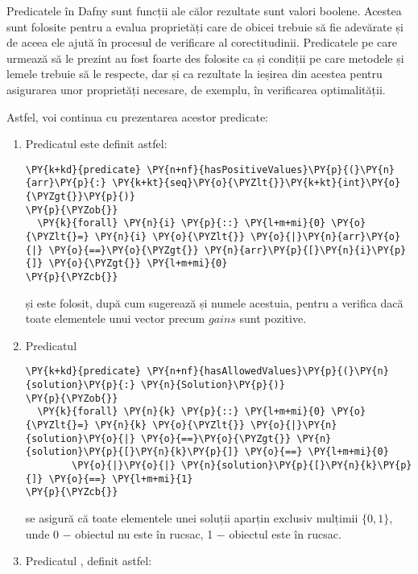 \begin{sloppypar}
Predicatele în Dafny sunt funcții ale călor rezultate sunt valori boolene. Acestea sunt folosite pentru a evalua proprietăți care de obicei trebuie să fie adevărate și de aceea ele ajută în procesul de verificare al corectitudinii. Predicatele pe care urmează să le prezint au fost foarte des folosite ca și condiții pe care metodele și lemele trebuie să le respecte, dar și ca rezultate la ieșirea din acestea pentru asigurarea unor proprietăți necesare, de exemplu, în verificarea optimalității. \par
Astfel, voi continua cu prezentarea acestor predicate:
\begin{enumerate}
    \item Predicatul  este definit astfel:
    \begin{Verbatim}[commandchars=\\\{\}]
\PY{k+kd}{predicate} \PY{n+nf}{hasPositiveValues}\PY{p}{(}\PY{n}{arr}\PY{p}{:} \PY{k+kt}{seq}\PY{o}{\PYZlt{}}\PY{k+kt}{int}\PY{o}{\PYZgt{}}\PY{p}{)}
\PY{p}{\PYZob{}}
  \PY{k}{forall} \PY{n}{i} \PY{p}{::} \PY{l+m+mi}{0} \PY{o}{\PYZlt{}=} \PY{n}{i} \PY{o}{\PYZlt{}} \PY{o}{|}\PY{n}{arr}\PY{o}{|} \PY{o}{==}\PY{o}{\PYZgt{}} \PY{n}{arr}\PY{p}{[}\PY{n}{i}\PY{p}{]} \PY{o}{\PYZgt{}} \PY{l+m+mi}{0}
\PY{p}{\PYZcb{}}
\end{Verbatim}
    și este folosit, după cum sugerează și numele acestuia, pentru a verifica dacă toate elementele unui vector precum $gains$ sunt pozitive.
    \item Predicatul 
    \begin{Verbatim}[commandchars=\\\{\}]
\PY{k+kd}{predicate} \PY{n+nf}{hasAllowedValues}\PY{p}{(}\PY{n}{solution}\PY{p}{:} \PY{n}{Solution}\PY{p}{)}
\PY{p}{\PYZob{}}
  \PY{k}{forall} \PY{n}{k} \PY{p}{::} \PY{l+m+mi}{0} \PY{o}{\PYZlt{}=} \PY{n}{k} \PY{o}{\PYZlt{}} \PY{o}{|}\PY{n}{solution}\PY{o}{|} \PY{o}{==}\PY{o}{\PYZgt{}} \PY{n}{solution}\PY{p}{[}\PY{n}{k}\PY{p}{]} \PY{o}{==} \PY{l+m+mi}{0} 
        \PY{o}{|}\PY{o}{|} \PY{n}{solution}\PY{p}{[}\PY{n}{k}\PY{p}{]} \PY{o}{==} \PY{l+m+mi}{1}
\PY{p}{\PYZcb{}}
\end{Verbatim}
    se asigură că toate elementele unei soluții aparțin exclusiv mulțimii $\{0, 1\}$, unde 0 \(-\) obiectul nu este în rucsac, 1 \(-\) obiectul este în rucsac.
    \item Predicatul , definit astfel:
    \begin{Verbatim}[commandchars=\\\{\}]

\end{Verbatim}
\end{enumerate}
\end{sloppypar}
